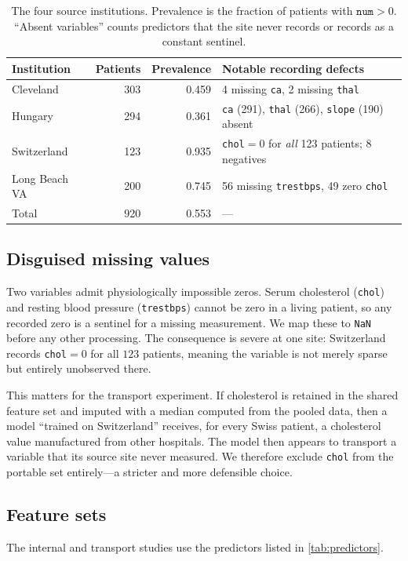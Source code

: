 \documentclass[manuscript,nonacm]{acmart}
\begin{document}
\begin{table}[t]
\centering
\caption{The four source institutions. Prevalence is the fraction of patients with
$\texttt{num}>0$. ``Absent variables'' counts predictors that the site never records or
records as a constant sentinel.}
\label{tab:cohorts}
\begin{tabular}{lrrl}
\toprule
Institution & Patients & Prevalence & Notable recording defects\\
\midrule
Cleveland          & 303 & 0.459 & 4 missing \texttt{ca}, 2 missing \texttt{thal}\\
Hungary            & 294 & 0.361 & \texttt{ca} (291), \texttt{thal} (266), \texttt{slope} (190) absent\\
Switzerland        & 123 & 0.935 & \texttt{chol}${}=0$ for \emph{all} 123 patients; 8 negatives\\
Long Beach VA      & 200 & 0.745 & 56 missing \texttt{trestbps}, 49 zero \texttt{chol}\\
\midrule
Total              & 920 & 0.553 & ---\\
\bottomrule
\end{tabular}
\end{table}

\subsection{Disguised missing values}
Two variables admit physiologically impossible zeros. Serum cholesterol
(\texttt{chol}) and resting blood pressure (\texttt{trestbps}) cannot be zero in a
living patient, so any recorded zero is a sentinel for a missing measurement. We map
these to \texttt{NaN} before any other processing. The consequence is severe at one
site: Switzerland records \texttt{chol}${}=0$ for all $123$ patients, meaning the
variable is not merely sparse but entirely unobserved there.

This matters for the transport experiment. If cholesterol is retained in the shared
feature set and imputed with a median computed from the pooled data, then a model
``trained on Switzerland'' receives, for every Swiss patient, a cholesterol value
manufactured from other hospitals. The model then appears to transport a variable that
its source site never measured. We therefore exclude \texttt{chol} from the portable
set entirely---a stricter and more defensible choice.

\subsection{Feature sets}
The internal and transport studies use the predictors listed in \cref{tab:predictors}.
\end{document}
